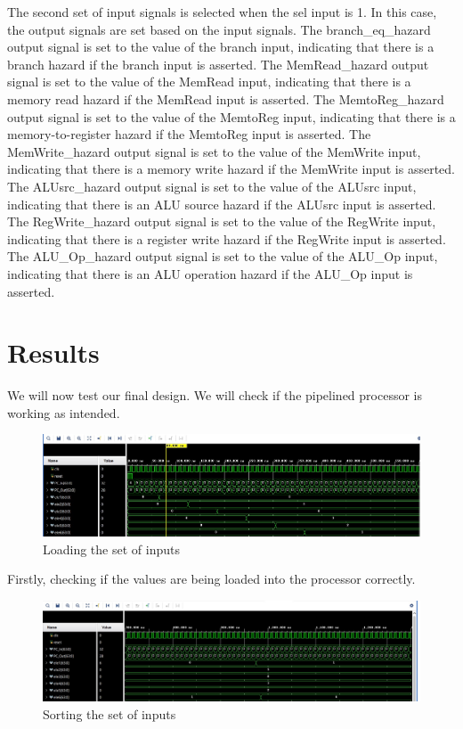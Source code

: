 \documentclass{article}
\begin{document}
The second set of input signals is selected when the sel input is 1. In this case, the output signals are set based on the input signals. The branch\_eq\_hazard output signal is set to the value of the branch input, indicating that there is a branch hazard if the branch input is asserted. The MemRead\_hazard output signal is set to the value of the MemRead input, indicating that there is a memory read hazard if the MemRead input is asserted. The MemtoReg\_hazard output signal is set to the value of the MemtoReg input, indicating that there is a memory-to-register hazard if the MemtoReg input is asserted. The MemWrite\_hazard output signal is set to the value of the MemWrite input, indicating that there is a memory write hazard if the MemWrite input is asserted. The ALUsrc\_hazard output signal is set to the value of the ALUsrc input, indicating that there is an ALU source hazard if the ALUsrc input is asserted. The RegWrite\_hazard output signal is set to the value of the RegWrite input, indicating that there is a register write hazard if the RegWrite input is asserted. The ALU\_Op\_hazard output signal is set to the value of the ALU\_Op input, indicating that there is an ALU operation hazard if the ALU\_Op input is asserted.

\section{Results}
We will now test our final design. We will check if the pipelined processor is working as intended. 

\begin{figure}[h]
    \centering
    \includegraphics*[width = 13 cm]{loadingvalues.jpeg}
    \caption{Loading the set of inputs}
    \label{fig: label 1}
\end{figure}

Firstly, checking if the values are being loaded into the processor correctly. 

\begin{figure}[h]
    \centering
    \includegraphics*[width = 13 cm]{firstsorting.jpeg}
    \caption{Sorting the set of inputs}
    \label{fig: label 2}
\end{figure}
\end{document}
